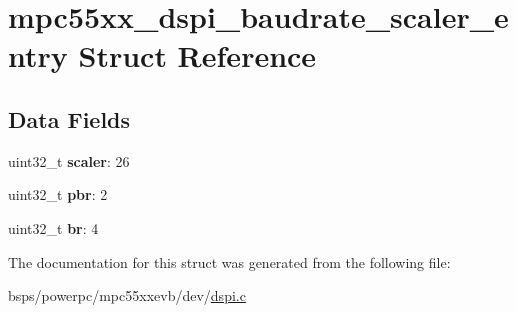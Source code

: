\hypertarget{structmpc55xx__dspi__baudrate__scaler__entry}{}\section{mpc55xx\+\_\+dspi\+\_\+baudrate\+\_\+scaler\+\_\+entry Struct Reference}
\label{structmpc55xx__dspi__baudrate__scaler__entry}
\subsection*{Data Fields}
\begin{DoxyCompactItemize}
\item 
\mbox{\label{structmpc55xx__dspi__baudrate__scaler__entry_ab335aebd5b1979f993328dd3d52b5c36}} 
uint32\+\_\+t {\bfseries scaler}\+: 26
\item 
\mbox{\label{structmpc55xx__dspi__baudrate__scaler__entry_a34c2e7916c861d8273f37efad450575d}} 
uint32\+\_\+t {\bfseries pbr}\+: 2
\item 
\mbox{\label{structmpc55xx__dspi__baudrate__scaler__entry_a60f2e8631eecf7a52ccab3eebf9b20e6}} 
uint32\+\_\+t {\bfseries br}\+: 4
\end{DoxyCompactItemize}


The documentation for this struct was generated from the following file\+:\begin{DoxyCompactItemize}
\item 
bsps/powerpc/mpc55xxevb/dev/\mbox{\hyperlink{dspi_8c}{dspi.\+c}}\end{DoxyCompactItemize}
